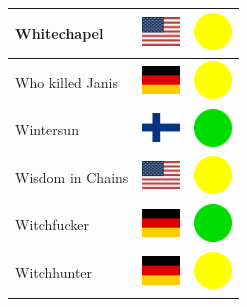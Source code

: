 \documentclass[12pt, a4paper, twoside]{report}
\begin{document}
\begin{center}
\begin{longtable}{|p{5cm}|p{2cm}|p{2cm}|}
Whitechapel & \includegraphics[width=1cm]{4x3/us} & \includegraphics[width=1cm]{likes/m} \\ \hline
Who killed Janis & \includegraphics[width=1cm]{4x3/de} & \includegraphics[width=1cm]{likes/m} \\ \hline
Wintersun & \includegraphics[width=1cm]{4x3/fi} & \includegraphics[width=1cm]{likes/y} \\ \hline
Wisdom in Chains & \includegraphics[width=1cm]{4x3/us} & \includegraphics[width=1cm]{likes/m} \\ \hline
Witchfucker & \includegraphics[width=1cm]{4x3/de} & \includegraphics[width=1cm]{likes/y} \\ \hline
Witchhunter & \includegraphics[width=1cm]{4x3/de} & \includegraphics[width=1cm]{likes/m} \\ \hline

\end{longtable}
\end{center}
\end{document}
